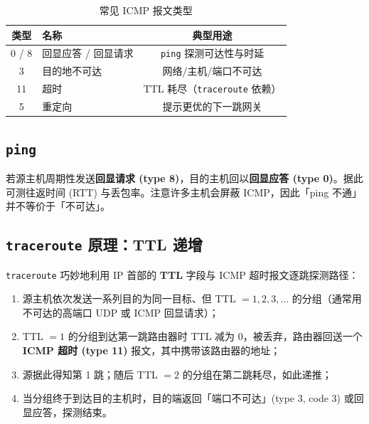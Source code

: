\begin{table}[H]
\centering
\caption{常见 ICMP 报文类型}
\renewcommand{\arraystretch}{1.3}
\begin{tabulary}{\textwidth}{@{}CLC@{}}
\toprule
\textbf{类型} & \textbf{名称} & \textbf{典型用途} \\
 / 8 & 回显应答 / 回显请求 & \texttt{ping} 探测可达性与时延 \\
3 & 目的地不可达 & 网络/主机/端口不可达 \\
11 & 超时 & TTL 耗尽（\texttt{traceroute} 依赖） \\
5 & 重定向 & 提示更优的下一跳网关 \\
\bottomrule
\end{tabulary}
\end{table}

\subsection{\texttt{ping}}

若源主机周期性发送\textbf{回显请求 (type 8)}，目的主机回以\textbf{回显应答 (type 0)}。据此可测往返时间 (RTT) 与丢包率。注意许多主机会屏蔽 ICMP，因此「ping 不通」并不等价于「不可达」。

\subsection{\texttt{traceroute} 原理：TTL 递增}

\texttt{traceroute} 巧妙地利用 IP 首部的 \textbf{TTL} 字段与 ICMP 超时报文逐跳探测路径：

\begin{enumerate}
    \item 源主机依次发送一系列目的为同一目标、但 TTL $=1,2,3,\dots$ 的分组（通常用不可达的高端口 UDP 或 ICMP 回显请求）；
    \item TTL $=1$ 的分组到达第一跳路由器时 TTL 减为 $0$，被丢弃，路由器回送一个 \textbf{ICMP 超时 (type 11)} 报文，其中携带该路由器的地址；
    \item 源据此得知第 1 跳；随后 TTL $=2$ 的分组在第二跳耗尽，如此递推；
    \item 当分组终于到达目的主机时，目的端返回「端口不可达」(type 3, code 3) 或回显应答，探测结束。
\end{enumerate}

